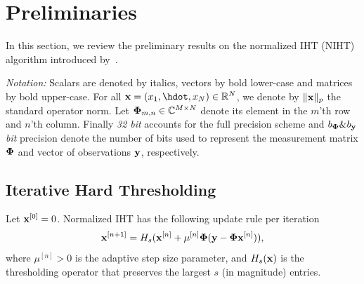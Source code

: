 \documentclass{article}
\begin{document}
\section{Preliminaries}\label{section_iht}

In this section, we review the preliminary results on the normalized IHT (NIHT) algorithm introduced by~\cite{blumensath2010niht, blumensath2012greedy}.

{\it Notation:} Scalars are denoted by italics, vectors by bold lower-case and matrices by bold upper-case. For all ${\bf x}= (x_1, \hdot, x_N) \in \mathbb{R}^N$, we denote by $\|{\bf x}\|_p$ the standard operator norm. Let ${\bf \Phi}_{m, n}\in \mathbb{C}^{M\times N}$ denote its element in the $m$'th row and $n$'th column. Finally {\it 32 bit} accounts for the full precision scheme and $b_{\bf \Phi}\&b_{\bf y}$ {\it bit} precision denote the number of bits used to represent the measurement matrix ${\bf \Phi}$ and vector of observations ${\bf y}$, respectively.
\subsection{Iterative Hard Thresholding} 
Let ${\bf x}^{[0]} = 0$. Normalized IHT has the following update rule per iteration
\begin{equation}\label{iht_update_rule}
{\bf x}^{[n+1]} = H_s({\bf x}^{[n]} + \mu^{[n]}{\bf \Phi}({\bf y}-{\bf \Phi}{\bf x}^{[n]})),
\end{equation}
where $\mu^{[n]}>0$ is the adaptive step size parameter, and $H_s({\bf x})$ is the
thresholding operator that preserves the largest $s$ (in magnitude) entries.



\end{document}

